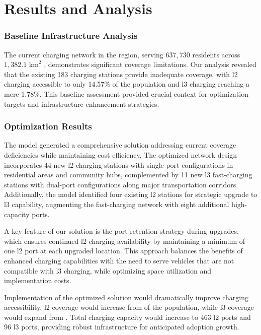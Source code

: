 \chapter{Results and Analysis}

\subsection*{Baseline Infrastructure Analysis}

The current charging network in the  region, serving $637,730$ residents \cite{statcan_census_2021} across $1,382.1 \text{ km}^2$ \cite{statcan_census_2021}, demonstrates significant coverage limitations. Our analysis revealed that the existing 183 charging stations \cite{ocm_2024} provide inadequate coverage, with \gls{l2} charging accessible to only 14.57\% of the population and \gls{l3} charging reaching a mere 1.78\%. This baseline assessment provided crucial context for optimization targets and infrastructure enhancement strategies.

\subsection*{Optimization Results}

The  model generated a comprehensive solution addressing current coverage deficiencies while maintaining cost efficiency. The optimized network design incorporates 44 new \gls{l2} charging stations with single-port configurations in residential areas and community hubs, complemented by 11 new \gls{l3} fast-charging stations with dual-port configurations along major transportation corridors. Additionally, the model identified four existing \gls{l2} stations for strategic upgrade to \gls{l3} capability, augmenting the fast-charging network with eight additional high-capacity ports.

A key feature of our solution is the port retention strategy during upgrades, which ensures continued \gls{l2} charging availability by maintaining a minimum of one \gls{l2} port at each upgraded location. This approach balances the benefits of enhanced charging capabilities with the need to serve vehicles that are not compatible with \gls{l3} charging, while optimizing space utilization and implementation costs.

Implementation of the optimized solution would dramatically improve charging accessibility. \gls{l2} coverage would increase from  of the population, while \gls{l3} coverage would expand from . Total charging capacity would increase to 463 \gls{l2} ports and 96 \gls{l3} ports, providing robust infrastructure for anticipated  adoption growth.

